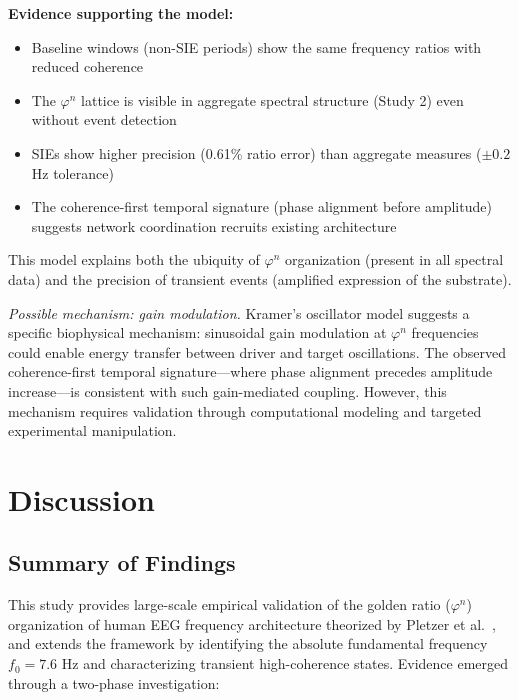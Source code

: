 \documentclass[11pt,a4paper]{article}
\newcommand{\phisym}{\varphi}
\begin{document}
\textbf{Evidence supporting the model:}
\begin{itemize}
    \item Baseline windows (non-SIE periods) show the same frequency ratios with reduced coherence
    \item The $\phisym^n$ lattice is visible in aggregate spectral structure (Study 2) even without event detection
    \item SIEs show higher precision (0.61\% ratio error) than aggregate measures ($\pm 0.2$ Hz tolerance)
    \item The coherence-first temporal signature (phase alignment before amplitude) suggests network coordination recruits existing architecture
\end{itemize}

This model explains both the ubiquity of $\phisym^n$ organization (present in all spectral data) and the precision of transient events (amplified expression of the substrate).

\textit{Possible mechanism: gain modulation.} Kramer's \parencite{kramer2022golden} oscillator model suggests a specific biophysical mechanism: sinusoidal gain modulation at $\phisym^n$ frequencies could enable energy transfer between driver and target oscillations. The observed coherence-first temporal signature---where phase alignment precedes amplitude increase---is consistent with such gain-mediated coupling. However, this mechanism requires validation through computational modeling and targeted experimental manipulation.

\section{Discussion}

\subsection{Summary of Findings}

This study provides large-scale empirical validation of the golden ratio ($\phisym^n$) organization of human EEG frequency architecture theorized by Pletzer et al.\ \parencite{pletzer2010golden}, and extends the framework by identifying the absolute fundamental frequency $f_0 = 7.6$ Hz and characterizing transient high-coherence states. Evidence emerged through a two-phase investigation:
\end{document}

